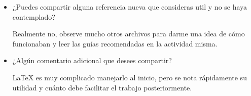 \documentclass[a4paper,12pt]{report}
\begin{document}
\begin{itemize}
\item ¿Puedes compartir alguna referencia nueva que consideras util y no se haya contemplado? 

Realmente no, observe mucho otros archivos para darme una idea de cómo funcionaban y leer las guías recomendadas en la actividad misma.

\item ¿Algún comentario adicional que desees compartir? 

LaTeX es muy complicado manejarlo al inicio, pero se nota rápidamente su utilidad y cuánto debe facilitar el trabajo posteriormente.

\end{itemize}
\end{document}
